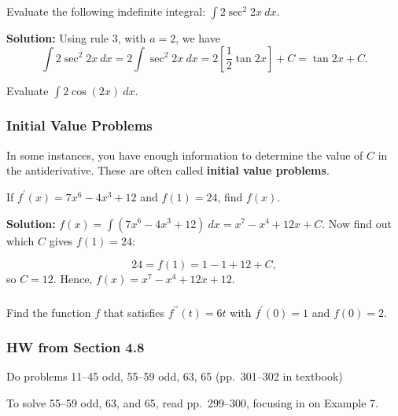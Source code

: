 \documentclass[14pt]{beamer}
\newcommand{\dint}{\displaystyle\int}
\begin{document}
\begin{frame}%
\frametitle{}
\footnotesize
\begin{ex} Evaluate the following indefinite integral: $\dint 2 \sec^2 2x\ dx$. \end{ex}

\vspace{1pc}
{\bf Solution:}  Using rule 3, with $a=2$, we have
\[\dint 2 \sec^2 2x\ dx = 2 \dint \sec^2 2x\ dx = 2 \left[ \dfrac{1}{2} \tan 2x \right] + C = \tan 2x + C.\]

\vspace{1pc}
\begin{exe} Evaluate $\dint 2 \cos(2x)\ dx$. \end{exe}
\end{frame}

\begin{frame}
\frametitle{\small Initial Value Problems}
\footnotesize
In some instances, you have enough information to determine the value of $C$ in the antiderivative.  These are often called {\bf initial value problems}.

\begin{ex} If $f^{\prime}(x)=7x^6-4x^3+12$ and $f(1)=24$, find $f(x)$. \end{ex} 

{\bf Solution:}  $f(x)=\dint (7x^6-4x^3+12)\ dx = x^7 - x^4 + 12x + C$.  Now find out which $C$ gives $f(1)=24$:

\vspace{-0.5pc}
\[24=f(1)=1-1+12+C,\] 
so $C=12$.  Hence, \alert{$f(x)=x^7 - x^4 + 12x + 12$}.
\end{frame}

\begin{frame}%
\frametitle{}
\begin{exe} Find the function $f$ that satisfies $f^{\prime\prime}(t)=6t$ with $f^{\prime}(0)=1$ and $f(0)=2$. \end{exe}
\end{frame}

\begin{frame}
\frametitle{HW from Section 4.8}
Do problems 11--45 odd, 55--59 odd, 63, 65 (pp.\ 301--302 in textbook)

\bigskip

To solve 55--59 odd, 63, and 65, read pp.\ 299--300, focusing in on Example 7.
\end{frame}
\end{document}
